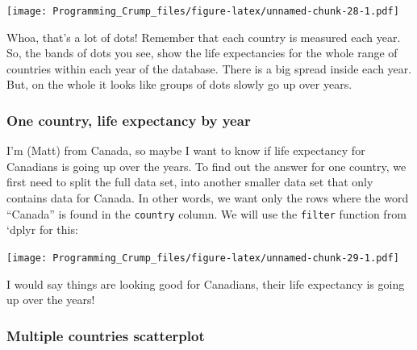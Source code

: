 \documentclass[]{book}
\newenvironment{Shaded}{\begin{snugshade}}{\end{snugshade}}
\newcommand{\KeywordTok}[1]{\textcolor[rgb]{0.13,0.29,0.53}{\textbf{{#1}}}}
\newcommand{\DataTypeTok}[1]{\textcolor[rgb]{0.13,0.29,0.53}{{#1}}}
\newcommand{\StringTok}[1]{\textcolor[rgb]{0.31,0.60,0.02}{{#1}}}
\newcommand{\CommentTok}[1]{\textcolor[rgb]{0.56,0.35,0.01}{\textit{{#1}}}}
\newcommand{\NormalTok}[1]{{#1}}
\theoremstyle{definition}
\theoremstyle{definition}
\theoremstyle{definition}
\theoremstyle{remark}
\begin{document}
\texttt{[image: Programming\_Crump\_files/figure-latex/unnamed-chunk-28-1.pdf]}

Whoa, that's a lot of dots! Remember that each country is measured each
year. So, the bands of dots you see, show the life expectancies for the
whole range of countries within each year of the database. There is a
big spread inside each year. But, on the whole it looks like groups of
dots slowly go up over years.

\subsubsection{One country, life expectancy by
year}\label{one-country-life-expectancy-by-year}

I'm (Matt) from Canada, so maybe I want to know if life expectancy for
Canadians is going up over the years. To find out the answer for one
country, we first need to split the full data set, into another smaller
data set that only contains data for Canada. In other words, we want
only the rows where the word ``Canada'' is found in the \texttt{country}
column. We will use the \texttt{filter} function from `dplyr for this:

\begin{Shaded}
\end{Shaded}

\texttt{[image: Programming\_Crump\_files/figure-latex/unnamed-chunk-29-1.pdf]}

I would say things are looking good for Canadians, their life expectancy
is going up over the years!

\subsubsection{Multiple countries
scatterplot}\label{multiple-countries-scatterplot}
\end{document}
